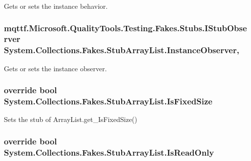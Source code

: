 Gets or sets the instance behavior.

\hypertarget{class_system_1_1_collections_1_1_fakes_1_1_stub_array_list_a3617b69753b39b4d6cd78346ca59e6c8}{
\subsubsection[{Instance\-Observer}]{\setlength{\rightskip}{0pt plus 5cm}mqttf.\-Microsoft.\-Quality\-Tools.\-Testing.\-Fakes.\-Stubs.\-I\-Stub\-Observer System.\-Collections.\-Fakes.\-Stub\-Array\-List.\-Instance\-Observer\hspace{0.3cm}{\ttfamily [get]}, {\ttfamily [set]}}}\label{class_system_1_1_collections_1_1_fakes_1_1_stub_array_list_a3617b69753b39b4d6cd78346ca59e6c8}


Gets or sets the instance observer.

\hypertarget{class_system_1_1_collections_1_1_fakes_1_1_stub_array_list_a9dc3bf01925e7803d01859b148fae63c}{
\subsubsection[{Is\-Fixed\-Size}]{\setlength{\rightskip}{0pt plus 5cm}override bool System.\-Collections.\-Fakes.\-Stub\-Array\-List.\-Is\-Fixed\-Size\hspace{0.3cm}{\ttfamily [get]}}}\label{class_system_1_1_collections_1_1_fakes_1_1_stub_array_list_a9dc3bf01925e7803d01859b148fae63c}


Sets the stub of Array\-List.\-get\-\_\-\-Is\-Fixed\-Size()

\hypertarget{class_system_1_1_collections_1_1_fakes_1_1_stub_array_list_a059530ac21563087b9e793d30de5ba61}{
\subsubsection[{Is\-Read\-Only}]{\setlength{\rightskip}{0pt plus 5cm}override bool System.\-Collections.\-Fakes.\-Stub\-Array\-List.\-Is\-Read\-Only\hspace{0.3cm}{\ttfamily [get]}}}\label{class_system_1_1_collections_1_1_fakes_1_1_stub_array_list_a059530ac21563087b9e793d30de5ba61}


